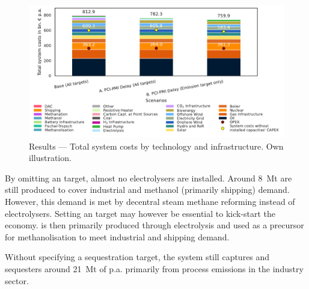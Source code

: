 \documentclass[10pt]{article}
\begin{document}
\begin{figure}[!htbp]
    \centering
    \includegraphics[width=1\textwidth]{system_costs}
    \caption{Results --- Total system costs by technology and infrastructure. Own illustration.}
    \label{fig:system_costs}
\end{figure}

By omitting an  target, almost no electrolysers are installed. Around \SI{8}{Mt} are still produced to cover industrial  and methanol (primarily shipping) demand. However, this demand is met by decentral steam methane reforming instead of electrolysers. Setting an  target may however be essential to kick-start the  economy.  is then primarily produced through electrolysis and used as a precursor for methanolisation to meet industrial and shipping demand.

Without specifying a  sequestration target, the system still captures and sequesters around \SI{21}{Mt} of  p.a. primarily from process emissions in the industry sector. 
\end{document}
